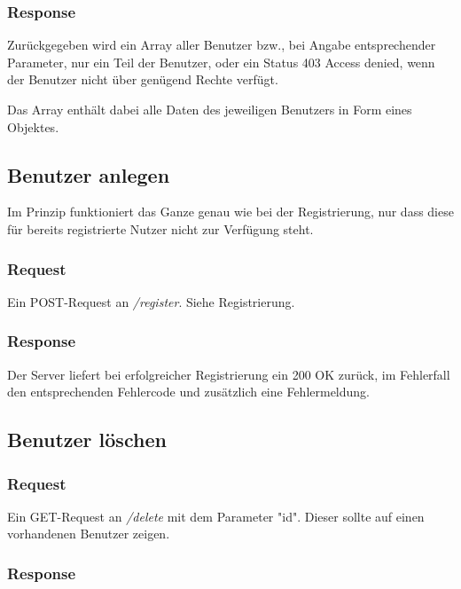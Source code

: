 \documentclass[ngerman]{scrartcl}
\begin{document}
		\subsubsection*{Response}
		
		Zurückgegeben wird ein Array aller Benutzer bzw., bei Angabe entsprechender Parameter, nur ein Teil der Benutzer, oder ein Status 403 Access denied, wenn der Benutzer nicht über genügend Rechte verfügt.
		
		Das Array enthält dabei alle Daten des jeweiligen Benutzers in Form eines Objektes.
	
	\subsection{Benutzer anlegen}
	
		Im Prinzip funktioniert das Ganze genau wie bei der Registrierung, nur dass diese für bereits registrierte Nutzer nicht zur Verfügung steht.
	
		\subsubsection*{Request}
		
		Ein POST-Request an \textit{/register}. Siehe Registrierung.
		
		\subsubsection*{Response}
		
		Der Server liefert bei erfolgreicher Registrierung ein 200 OK zurück, im Fehlerfall den entsprechenden Fehlercode und zusätzlich eine Fehlermeldung.
	
	\subsection{Benutzer löschen}
	
		\subsubsection*{Request}
		
		Ein GET-Request an \textit{/delete} mit dem Parameter "id".
		Dieser sollte auf einen vorhandenen Benutzer zeigen.
		
		\subsubsection*{Response}
		
\end{document}
